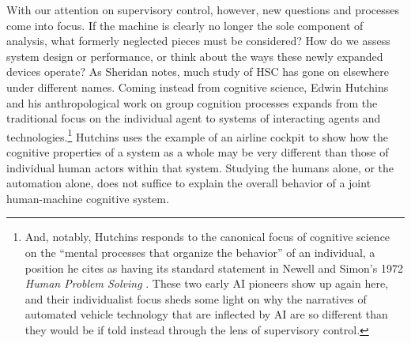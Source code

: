 With our attention on supervisory control, however, new questions and processes
come into focus. If the machine is clearly no
longer the sole component of analysis, what formerly neglected pieces
must be considered? How do we assess system design or performance, or
think about the ways these newly expanded devices operate? As Sheridan notes, much study of
HSC has gone on elsewhere under different names. Coming instead from cognitive
science, Edwin Hutchins and his anthropological work on group cognition
processes expands from the traditional focus on the individual agent
to systems of interacting agents and technologies.\footnote{And,
  notably, Hutchins responds to the canonical focus of 
  cognitive science on the ``mental processes that organize the
  behavior'' of an individual, a position he cites as having its
standard statement in Newell and Simon's 1972 \emph{Human Problem
  Solving} \cite[p. 265-266]{hutchinsCockpit}. These two early AI pioneers show
up again here, and their individualist focus sheds some 
light on why the narratives of automated vehicle technology that are
inflected by AI are so different than they would be if told instead
through the lens of supervisory control.}
Hutchins uses the example of an airline cockpit \cite{hutchinsCockpit} to show how the cognitive
properties of a system as a whole may be very different than those of
individual human actors within that system. Studying the humans alone,
or the automation alone, does not suffice to explain the overall
behavior of a joint human-machine cognitive system.




